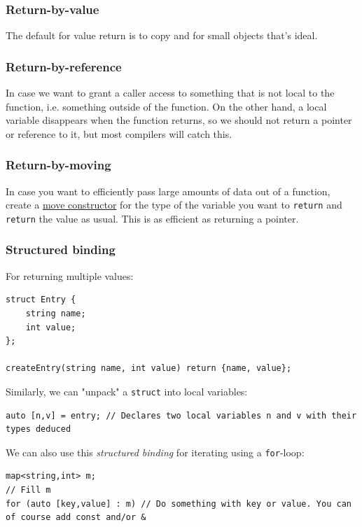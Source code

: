 \documentclass[table, xcdraw]{article}%
\begin{document}
\subsubsection{Return-by-value}
The default for value return is to copy and for small objects that’s ideal.

\subsubsection{Return-by-reference}
In case we want to grant a caller access to something that is not local to the function, i.e. something outside of the function. On the other hand, a local variable disappears when the function returns, so we should not return a pointer or reference to it, but most compilers will catch this.

\subsubsection{Return-by-moving}
In case you want to efficiently pass large amounts of data out of a function, create a \hyperref[moveconstructor]{move constructor} for the type of the variable you want to \texttt{return} and \texttt{return} the value as usual. This is as efficient as returning a pointer.

\subsubsection{Structured binding}
For returning multiple values:

\begin{verbatim}
struct Entry {
    string name;
    int value;
};

createEntry(string name, int value) return {name, value}; 
\end{verbatim}

Similarly, we can "unpack" a \texttt{struct} into local variables:

\begin{verbatim}
auto [n,v] = entry; // Declares two local variables n and v with their types deduced
\end{verbatim}

We can also use this \textit{structured binding} for iterating using a \texttt{for}-loop:

\begin{verbatim}
map<string,int> m;
// Fill m
for (auto [key,value] : m) // Do something with key or value. You can of course add const and/or &
\end{verbatim}
\end{document}
